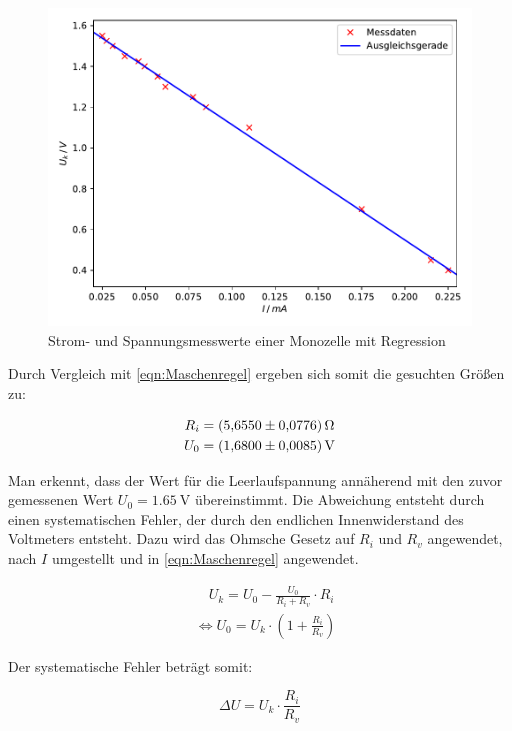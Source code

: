 \begin{figure}
  \centering
  \includegraphics[scale=0.75]{content/plot1.pdf}
  \caption{Strom- und Spannungsmesswerte einer Monozelle mit Regression}
  \label{fig:plot1}
\end{figure}

Durch Vergleich mit \ref{eqn:Maschenregel} ergeben sich somit 
die gesuchten Größen zu: 

\begin{align}
R_i &= \SI{5.655+-0.0776}{\ohm}\\
U_0 &= \SI{1.680+-0.0085}{\volt}
\end{align}

Man erkennt, dass der Wert für die Leerlaufspannung annäherend mit den zuvor
gemessenen Wert $U_0 = \SI{1.65}{\volt}$ übereinstimmt. Die Abweichung entsteht
durch einen systematischen Fehler, der durch den endlichen Innenwiderstand des
Voltmeters entsteht.
Dazu wird das Ohmsche Gesetz auf $R_i$ und $R_v$ angewendet, nach $I$ umgestellt
und in \ref{eqn:Maschenregel} angewendet.

\begin{align*}
&\quad U_k = U_0 - \frac{U_0}{R_i+R_v}\cdot R_i\\
&\Leftrightarrow U_0 = U_k\cdot (1 + \frac{R_i}{R_v})
\end{align*}

Der systematische Fehler beträgt somit:

\begin{equation}
\Delta U = U_k\cdot \frac{R_i}{R_v}
\end{equation}


